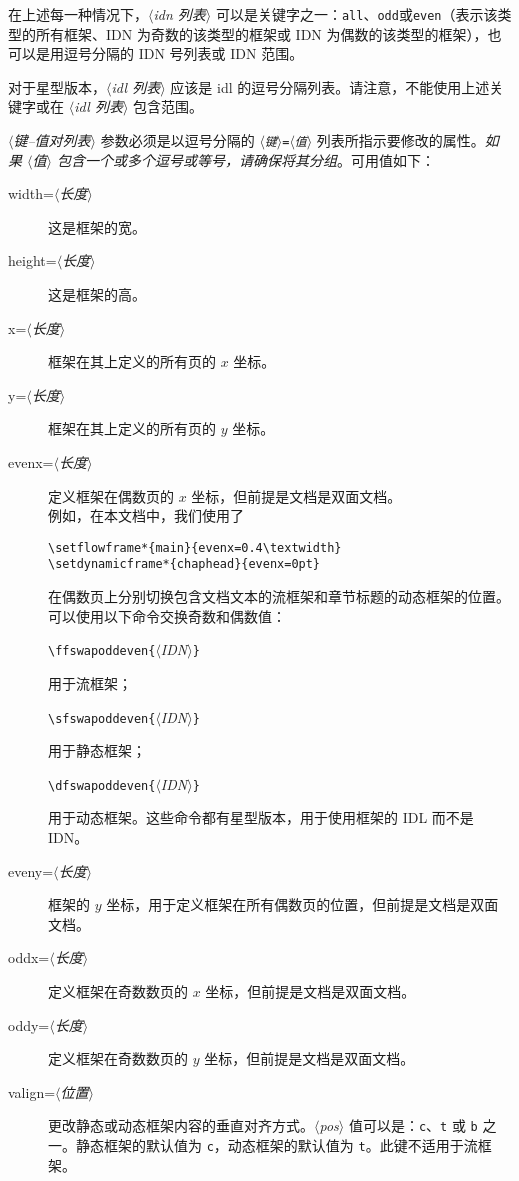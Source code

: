 \documentclass[a4paper]{book}%
\newcommand{\meta}[1]{\textnormal{\ensuremath{\langle}\makebox[0pt][l]{}\emph{#1}\makebox[0pt][l]{}\ensuremath{\rangle}}}
\newcommand{\cmd}[1]{\texttt{#1}}
\begin{document}
在上述每一种情况下，\meta{idn 列表} 可以是关键字之一：\cmd{all}、\cmd{odd}或\cmd{even}（表示该类型的所有框架、IDN 为奇数的该类型的框架或 IDN 为偶数的该类型的框架），也可以是用逗号分隔的 IDN 号列表或 IDN 范围。

对于星型版本，\meta{idl 列表} 应该是 idl 的逗号分隔列表。请注意，不能使用上述关键字或在 \meta{idl 列表} 包含范围。

\meta{键{--}值对列表} 参数必须是以逗号分隔的 \cmd{\meta{键}=\meta{值}} 列表所指示要修改的属性。\emph{如果 \meta{值} 包含一个或多个逗号或等号，请确保将其分组}。可用值如下：
\begin{description}
    \item[width=\meta{长度}] 这是框架的宽。
    \item[height=\meta{长度}] 这是框架的高。
    \item[x=\meta{长度}] 框架在其上定义的所有页的 $x$ 坐标。
    \item[y=\meta{长度}] 框架在其上定义的所有页的 $y$ 坐标。
    \item[evenx=\meta{长度}] 定义框架在偶数页的 $x$ 坐标，但前提是文档是双面文档。\\
    例如，在本文档中，我们使用了
\begin{lstlisting}[backgroundcolor=\color{white}]
\setflowframe*{main}{evenx=0.4\textwidth}
\setdynamicframe*{chaphead}{evenx=0pt}
\end{lstlisting}
    在偶数页上分别切换包含文档文本的流框架和章节标题的动态框架的位置。\\
    可以使用以下命令交换奇数和偶数值：
    \begin{mdframed}
    \verb|\ffswapoddeven{|\meta{IDN}\verb|}|
    \end{mdframed}
    用于流框架；
    \begin{mdframed}
    \verb|\sfswapoddeven{|\meta{IDN}\verb|}|
    \end{mdframed}
    用于静态框架；
    \begin{mdframed}
    \verb|\dfswapoddeven{|\meta{IDN}\verb|}|
    \end{mdframed}
    用于动态框架。这些命令都有星型版本，用于使用框架的 IDL 而不是 IDN。
    \item[eveny=\meta{长度}] 框架的 $y$ 坐标，用于定义框架在所有偶数页的位置，但前提是文档是双面文档。
    \item[oddx=\meta{长度}] 定义框架在奇数数页的 $x$ 坐标，但前提是文档是双面文档。
    \item[oddy=\meta{长度}] 定义框架在奇数数页的 $y$ 坐标，但前提是文档是双面文档。
    \item[valign=\meta{位置}] 更改静态或动态框架内容的垂直对齐方式。\meta{pos} 值可以是：\cmd{c}、\cmd{t} 或 \cmd{b} 之一。静态框架的默认值为 \cmd{c}，动态框架的默认值为 \cmd{t}。此键不适用于流框架。

\end{description}
\end{document}
